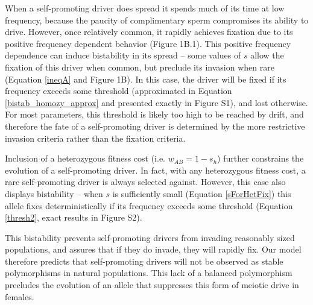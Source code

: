 \documentclass{pnastwo}
\begin{document}
\begin{article}
When a self-promoting driver does spread 
	it spends much of its time at low frequency, 
	because the paucity of complimentary sperm compromises its ability to drive. 
However, once relatively common, it  rapidly achieves fixation due to its
	positive frequency dependent behavior (Figure 1B.1).  
This positive frequency dependence can 
	induce bistability in its spread -- some values of $s$ 
	allow the fixation of this driver when common, but 
	preclude its invasion when rare (Equation \ref{ineqA} and Figure 1B). 
In this case, the driver will be fixed if its frequency exceeds some threshold 
	(approximated in Equation \ref{bistab_homozy_approx} and  presented exactly in 
	Figure S1), and lost otherwise. 
For most parameters, this threshold is likely too high to be reached by drift, 
	and therefore  the fate of a self-promoting driver is determined
	by the more restrictive invasion criteria rather than the fixation criteria. 

Inclusion of a heterozygous fitness cost (i.e. $w_{AB}=1-s_h$)
	further constrains the evolution of a self-promoting driver. 
In fact, with any heterozygous fitness cost, a rare self-promoting
	driver is always selected against. 
However, this case also displays bistability -- 
	when $s$ is sufficiently small (Equation \ref{sForHetFix}) this allele fixes deterministically if its 
	frequency exceeds some threshold  (Equation \ref{thresh2}, exact results in 
	Figure S2).

This bistability prevents self-promoting drivers from invading 	
	reasonably sized populations, and assures that if they do invade, they will rapidly fix.
Our model therefore predicts that self-promoting drivers will not be
	observed as stable polymorphisms in natural populations. 
This lack of a balanced polymorphism
	precludes the evolution of an
	allele that suppresses this form of meiotic drive in females.


\end{article}
\end{document}
